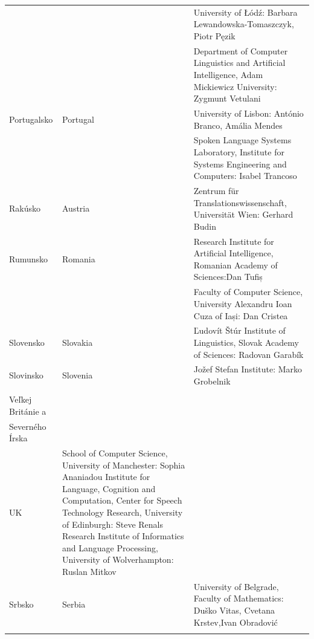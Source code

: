 \begin{longtable}{@{}llp{113mm}@{}}
  & & University of Łódź: Barbara Lewandowska-Tomaszczyk, Piotr Pęzik\\ \addlinespace
  & & Department of Computer Linguistics and Artificial Intelligence, Adam Mickiewicz University: Zygmunt Vetulani \\ \addlinespace
  Portugalsko & \textcolor{grey1}{Portugal} & University of Lisbon: António Branco, Amália Mendes \\ \addlinespace
  & & Spoken Language Systems Laboratory, Institute for Systems Engineering and Computers: Isabel Trancoso \\ \addlinespace
  Rakúsko & \textcolor{grey1}{Austria} & Zentrum für Translationswissenschaft, Universität Wien: Gerhard Budin\\ \addlinespace 
  Rumunsko & \textcolor{grey1}{Romania} & Research Institute for Artificial Intelligence, Romanian Academy of Sciences:\newline Dan Tufiș \\ \addlinespace
  & & Faculty of Computer Science, University Alexandru Ioan Cuza of Iași: Dan Cristea \\ \addlinespace
  Slovensko & \textcolor{grey1}{Slovakia} & Ľudovít Štúr Institute of Linguistics, Slovak Academy of Sciences: Radovan Garabík \\ \addlinespace 
  Slovinsko & \textcolor{grey1}{Slovenia} & Jožef Stefan Institute: Marko Grobelnik \\ \addlinespace 
      \begin{minipage}[t]{0.2\columnwidth}%
      Spojené kráľovstvo \\
      Veľkej Británie a \\
      Severného Írska 
      \end{minipage}
            & \begin{minipage}[t]{0.15\columnwidth}%
                \hfill \\
                \textcolor{grey1}{UK} 
              \end{minipage}
            & 
  School of Computer Science, University of Manchester: Sophia Ananiadou \newline Institute for Language, Cognition and Computation, Center for Speech Technology Research, University of Edinburgh: Steve Renals \newline Research Institute of Informatics and Language Processing, University of Wolverhampton: Ruslan Mitkov \\ \addlinespace 
  Srbsko & \textcolor{grey1}{Serbia} & University of Belgrade, Faculty of Mathematics: Duško Vitas, Cvetana Krstev,\newline Ivan Obradović \\ \addlinespace

\end{longtable}
